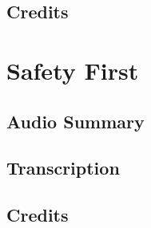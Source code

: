 \subsection{Credits}

\section{Safety First}

\subsection{Audio Summary}

\subsection{Transcription}

\subsection{Credits}